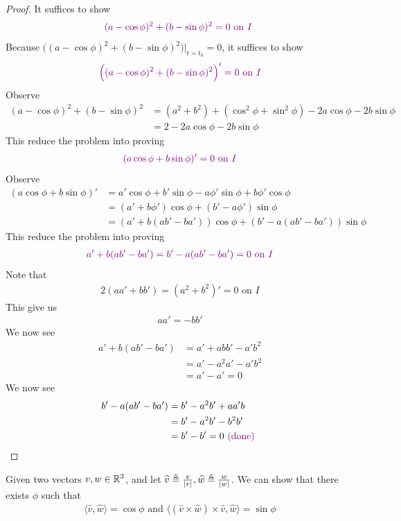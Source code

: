 \documentclass{report}
\begin{document}
\begin{proof}
It suffices to show 
\begin{align*}
  \textcolor{violet}{(a-\cos \phi)^2 + (b- \sin \phi)^2 =0\text{ on $I$ }}
\end{align*}
Because $\big((a-\cos \phi)^2 + (b- \sin \phi)^2 \big)\big|_{t=t_0}=0$, it suffices to show 
\begin{align*}
  \textcolor{violet}{ \Big((a-\cos \phi)^2 + (b- \sin \phi)^2 \Big)'=0\text{ on }I}
\end{align*}
Observe 
\begin{align*}
  (a-\cos \phi)^2+ (b-\sin  \phi)^2&=(a^2+b^2)+(\cos^2 \phi + \sin^2 \phi)- 2a \cos \phi -2b \sin \phi\\
  &=2-2a \cos \phi -2b \sin \phi
\end{align*}
This reduce the problem into proving 
\begin{align*}
 \textcolor{violet}{(a\cos \phi+ b \sin \phi)'=0\text{ on }I}
\end{align*}
Observe 
\begin{align*}
  (a\cos \phi+ b \sin \phi)'&=a'\cos \phi + b' \sin \phi -a \phi' \sin \phi + b \phi' \cos \phi\\
  &= (a'+b\phi')\cos \phi + (b'-a\phi')\sin \phi \\
  &=(a'+ b(ab'-ba'))\cos \phi + (b'-a(ab'-ba')) \sin \phi
\end{align*}
This reduce the problem into proving 
\begin{align*}
\textcolor{violet}{a'+b(ab'-ba')=b'-a(ab'-ba')=0\text{ on }I}
\end{align*}
Note that 
\begin{align*}
2(aa'+bb')=(a^2+b^2)'=0\text{ on }I
\end{align*}
This give us 
\begin{align*}
aa'=-bb'
\end{align*}
We now see 
\begin{align*}
a'+b(ab'-ba')&=a'+abb'-a'b^2\\
&=a'-a^2a'-a'b^2\\
&=a'-a'=0
\end{align*}
We now see 
\begin{align*}
b'-a(ab'-ba')&=b'-a^2b'+aa'b\\
&=b'-a^2b'-b^2b'\\
&=b'-b'=0 \textcolor{violet}{\text{ (done) }}
\end{align*}
\end{proof}
\begin{mdframed}
Given two vectors $v,w\in\mathbb{R}^3$, and let $\widehat{v}\triangleq \frac{v}{\left|v\right|}, \widehat{w}\triangleq \frac{w}{\left|w\right|}$. We can show that there exists $\phi$ such that 
\begin{align*}
\langle \widehat{v},\widehat{w}\rangle = \cos \phi \text{ and } \langle (\widehat{v}\times \widehat{w})\times \widehat{v}, \widehat{w}\rangle   = \sin \phi
\end{align*}
\end{mdframed}
\begin{lemma}

\end{lemma}
\end{document}
